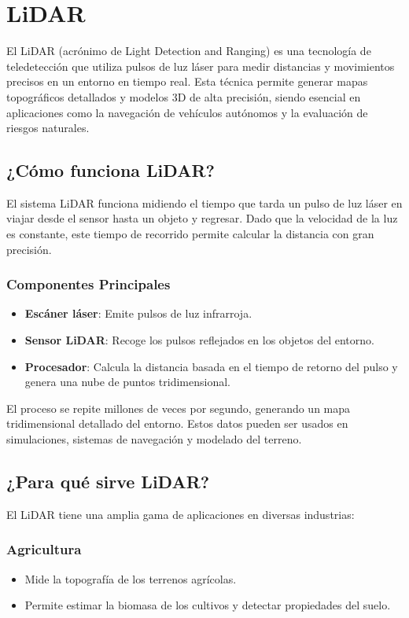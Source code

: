 	\section{\textbf{LiDAR}} El LiDAR (acrónimo de Light Detection and Ranging) es una tecnología de teledetección que utiliza pulsos de luz láser para medir distancias y movimientos precisos en un entorno en tiempo real. Esta técnica permite generar mapas topográficos detallados y modelos 3D de alta precisión, siendo esencial en aplicaciones como la navegación de vehículos autónomos y la evaluación de riesgos naturales.
\subsection{\textbf{¿Cómo funciona LiDAR?}}
El sistema LiDAR funciona midiendo el tiempo que tarda un pulso de luz láser en viajar desde el sensor hasta un objeto y regresar. Dado que la velocidad de la luz es constante, este tiempo de recorrido permite calcular la distancia con gran precisión.

\subsubsection{\textbf{Componentes Principales}}
\begin{itemize}
	\item \textbf{Escáner láser}: Emite pulsos de luz infrarroja.
	\item \textbf{Sensor LiDAR}: Recoge los pulsos reflejados en los objetos del entorno.
	\item \textbf{Procesador}: Calcula la distancia basada en el tiempo de retorno del pulso y genera una nube de puntos tridimensional.
\end{itemize}

El proceso se repite millones de veces por segundo, generando un mapa tridimensional detallado del entorno. Estos datos pueden ser usados en simulaciones, sistemas de navegación y modelado del terreno.
\subsection{\textbf{¿Para qué sirve LiDAR?}}
El LiDAR tiene una amplia gama de aplicaciones en diversas industrias:

\subsubsection{\textbf{Agricultura}}
\begin{itemize}
	\item Mide la topografía de los terrenos agrícolas.
	\item Permite estimar la biomasa de los cultivos y detectar propiedades del suelo.
\end{itemize}

